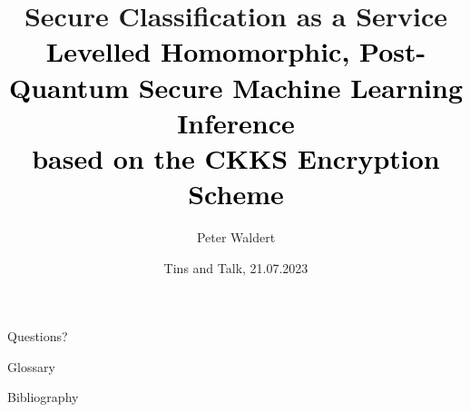 \documentclass[aspectratio=169, onlytextwidth, hyperref={colorlinks=true}]{beamer}
\title[Secure Classification as a Service]{
  Secure Classification as a Service \\
  \small\normalfont\textcolor{black}{
    Levelled Homomorphic, Post-Quantum Secure Machine Learning Inference \\
    based on the CKKS Encryption Scheme
  }
}
\author{Peter Waldert}
\date{Tins and Talk, 21.07.2023}
\institute{IAIK}
\begin{document}
  \begin{frame}[plain]
    \maketitle
  \end{frame}

  
  
  
  
  
  
  

  \section*{}
  \begin{frame}[c]
    \centering
    \Large Questions?
  \end{frame}

  \begin{frame}[allowframebreaks]{Glossary}
    \printnoidxglossary[type=acronym]
  \end{frame}

  \begin{frame}[allowframebreaks]{Bibliography}
    \printbibliography
  \end{frame}

  
\end{document}
